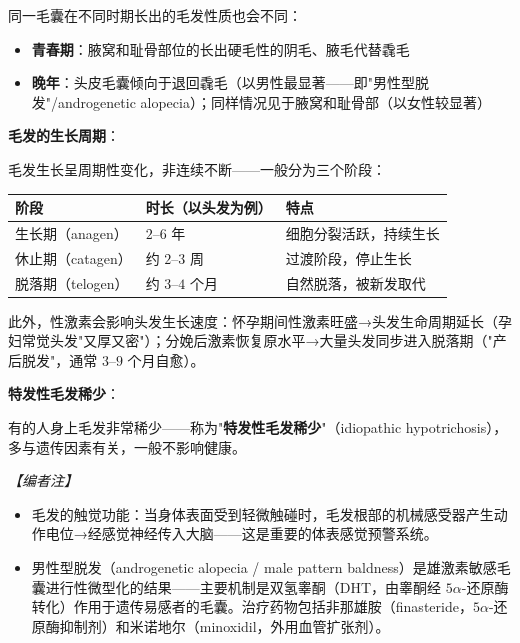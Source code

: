 同一毛囊在不同时期长出的毛发性质也会不同：
\begin{itemize}
	\item \textbf{青春期}：腋窝和耻骨部位的长出硬毛性的阴毛、腋毛代替毳毛
	\item \textbf{晚年}：头皮毛囊倾向于退回毳毛（以男性最显著——即"男性型脱发"/androgenetic alopecia）；同样情况见于腋窝和耻骨部（以女性较显著）
\end{itemize}

\vspace{0.5em}
\noindent\textbf{毛发的生长周期}：

毛发生长呈周期性变化，非连续不断——一般分为三个阶段：

\begin{center}\small
\begin{tabular}{|l|p{4cm}|p{5cm}|}
\hline
阶段 & 时长（以头发为例） & 特点 \\
\hline
生长期（anagen） & $2$--$6$ 年 & 细胞分裂活跃，持续生长 \\
休止期（catagen） & 约 $2$--$3$ 周 & 过渡阶段，停止生长 \\
脱落期（telogen） & 约 $3$--$4$ 个月 & 自然脱落，被新发取代 \\
\hline
\end{tabular}
\end{center}

此外，性激素会影响头发生长速度：怀孕期间性激素旺盛→头发生命周期延长（孕妇常觉头发"又厚又密"）；分娩后激素恢复原水平→大量头发同步进入脱落期（"产后脱发"，通常 $3$--$9$ 个月自愈）。

\vspace{0.5em}
\noindent\textbf{特发性毛发稀少}：

有的人身上毛发非常稀少——称为"\textbf{特发性毛发稀少}"（idiopathic hypotrichosis），多与遗传因素有关，一般不影响健康。

\vspace{0.5em}
\noindent\textit{【编者注】}
\begin{itemize}
	\item 毛发的触觉功能：当身体表面受到轻微触碰时，毛发根部的机械感受器产生动作电位→经感觉神经传入大脑——这是重要的体表感觉预警系统。
	\item 男性型脱发（androgenetic alopecia / male pattern baldness）是雄激素敏感毛囊进行性微型化的结果——主要机制是双氢睾酮（DHT，由睾酮经 $5\alpha$-还原酶转化）作用于遗传易感者的毛囊。治疗药物包括非那雄胺（finasteride，$5\alpha$-还原酶抑制剂）和米诺地尔（minoxidil，外用血管扩张剂）。
\end{itemize}

